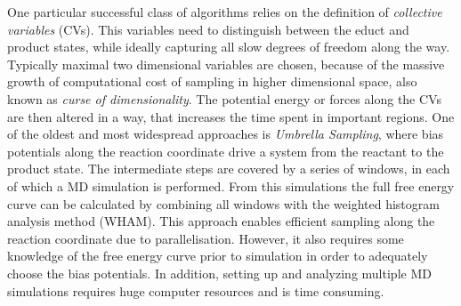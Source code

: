 One particular successful class of algorithms relies on the definition of \textit{collective variables} (CVs).
This variables need to distinguish between the educt and product states, while ideally capturing all slow degrees of freedom along the way.\autocite{fiorin2013using}
Typically maximal two dimensional variables are chosen, because of the massive growth of computational cost of sampling in higher dimensional space, also known as \textit{curse of dimensionality}.\autocite{koppen2000curse}
The potential energy or forces along the CVs are then altered in a way, that increases the time spent in important regions.
One of the oldest and most widespread approaches is \textit{Umbrella Sampling}\autocite{kastner2011umbrella}, where bias potentials along the reaction coordinate drive a system from the reactant to the product state.
The intermediate steps are covered by a series of windows, in each of which a MD simulation is performed.
From this simulations the full free energy curve can be calculated by combining all windows with the weighted histogram analysis method (WHAM).\autocite{kumar1992weighted}
This approach enables efficient sampling along the reaction coordinate due to parallelisation.
However, it also requires some knowledge of the free energy curve prior to simulation in order to adequately choose the bias potentials.
In addition, setting up and analyzing multiple MD simulations requires huge computer resources and is time consuming.

